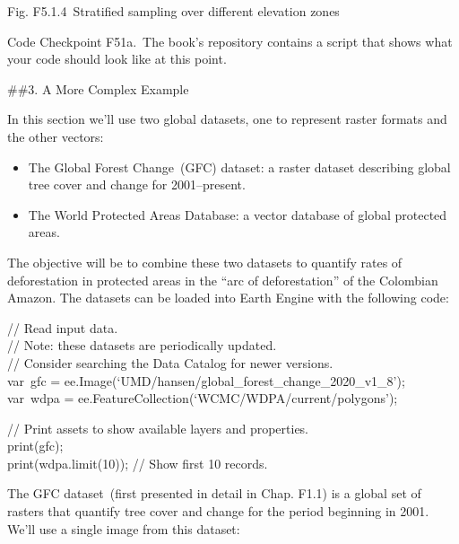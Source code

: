 \documentclass[
  letterpaper,
  DIV=11,
  numbers=noendperiod]{scrreprt}
\providecommand{\tightlist}{%
  \setlength{\itemsep}{0pt}\setlength{\parskip}{0pt}}\usepackage{longtable,booktabs,array}
\begin{document}
Fig. F5.1.4~Stratified sampling over different elevation zones

\begin{tcolorbox}[enhanced jigsaw, left=2mm, breakable, rightrule=.15mm, opacityback=0, colframe=quarto-callout-note-color-frame, colbacktitle=quarto-callout-note-color!10!white, arc=.35mm, opacitybacktitle=0.6, toptitle=1mm, colback=white, leftrule=.75mm, title=\textcolor{quarto-callout-note-color}{\faInfo}\hspace{0.5em}{Note}, toprule=.15mm, bottomtitle=1mm, titlerule=0mm, bottomrule=.15mm, coltitle=black]

Code Checkpoint F51a.~The book's repository contains a script that shows
what your code should look like at this point.

\end{tcolorbox}

\#\#3. A More Complex Example

In this section we'll use two global datasets, one to represent raster
formats and the other vectors:

\begin{itemize}
\tightlist
\item
  The Global Forest Change~(GFC) dataset: a raster dataset describing
  global tree cover and change for 2001--present.
\item
  The World Protected Areas Database: a vector database of global
  protected areas.
\end{itemize}

The objective will be to combine these two datasets to quantify rates of
deforestation in protected areas in the ``arc of deforestation'' of the
Colombian Amazon. The datasets can be loaded into Earth Engine with the
following code:

// Read input data.\\
// Note: these datasets are periodically updated.\\
// Consider searching the Data Catalog for newer versions.\\
var~gfc = ee.Image(`UMD/hansen/global\_forest\_change\_2020\_v1\_8');\\
var~wdpa = ee.FeatureCollection(`WCMC/WDPA/current/polygons');

// Print assets to show available layers and properties.\\
print(gfc);\\
print(wdpa.limit(10)); // Show first 10 records.

The GFC dataset~(first presented in detail in Chap. F1.1) is a global
set of rasters that quantify tree cover and change for the period
beginning in 2001. We'll use a single image from this dataset:
\end{document}
